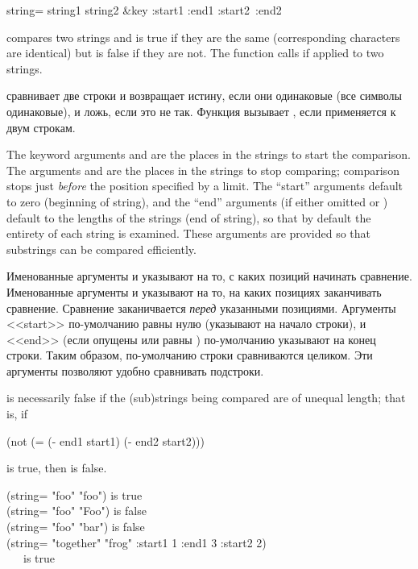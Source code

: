 \begin{defun}[Function]
string= string1 string2 &key :start1 :end1 :start2~:end2

 compares two strings and is true if
they are the same (corresponding characters are identical)
but is false if they are not.
The function  calls  if
applied to two strings.

 сравнивает две строки и возвращает истину, если они одинаковые
(все символы одинаковые), и ложь, если это не так.
Функция  вызывает , если применяется к двум строкам.

The keyword arguments  and  are the places
in the strings to start the comparison.
The arguments  and  are the
places in the strings to stop comparing; comparison stops just
\emph{before} the position specified by a limit.
The ``start'' arguments default to zero (beginning of string),
and the ``end'' arguments (if either omitted or {\false})
default to the lengths of the strings (end of string),
so that by default the entirety of each string is examined.
These arguments are provided so that substrings can be compared
efficiently.

Именованные аргументы  и  указывают на то, с каких
позиций начинать сравнение.
Именованные аргументы  и  указывают на то, на каких
позициях заканчивать сравнение.
Сравнение заканичвается \emph{перед} указанными позициями.
Аргументы <<start>> по-умолчанию равны нулю (указывают на начало строки), и 
<<end>> (если опущены или равны {\false}) по-умолчанию указывают на конец
строки. Таким образом, по-умолчанию строки сравниваются целиком.
Эти аргументы позволяют удобно сравнивать подстроки.

 is necessarily false if the (sub)strings
being compared are of unequal length; that is, if
\begin{lisp}
(not (= (- end1 start1) (- end2 start2)))
\end{lisp}
is true, then  is false.

\begin{lisp}
(string= "foo" "foo") \textrm{is true} \\
(string= "foo" "Foo") \textrm{is false} \\
(string= "foo" "bar") \textrm{is false} \\
(string= "together" "frog" :start1 1 :end1 3 :start2 2) \\
~~~\textrm{is true}
\end{lisp}


\end{defun}
